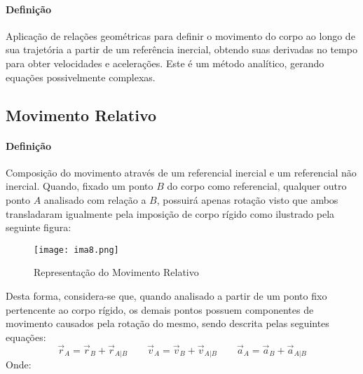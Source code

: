 \documentclass{article}
\begin{document}
            \paragraph{Definição}Aplicação de relações geométricas para definir o movimento do corpo ao longo de sua trajetória a partir de um referência inercial, obtendo suas derivadas no tempo para obter velocidades e acelerações. Este é um método analítico, gerando equações possivelmente complexas.

        \subsection{Movimento Relativo}
            \paragraph{Definição}Composição do movimento através de um referencial inercial e um referencial não inercial. Quando, fixado um ponto $B$ do corpo como referencial, qualquer outro ponto $A$ analisado com relação a $B$, possuirá apenas rotação visto que ambos transladaram igualmente pela imposição de corpo rígido como ilustrado pela seguinte figura:
                \begin{figure}[H]
                    \centering
                    \texttt{[image: ima8.png]}
                    \caption{Representação do Movimento Relativo}
                \end{figure} \noindent
            Desta forma, considera-se que, quando analisado a partir de um ponto fixo pertencente ao corpo rígido, os demais pontos possuem componentes de movimento causados pela rotação do mesmo, sendo descrita pelas seguintes equações:
                \begin{equation}
                    \boxed{
                        \vec{r}_{A} = \vec{r}_{B} + \vec{r}_{A|B}
                    }
                    \qquad
                    \boxed{
                        \vec{v}_{A} = \vec{v}_{B} + \vec{v}_{A|B}
                    }
                    \qquad
                    \boxed{
                        \vec{a}_{A} = \vec{a}_{B} + \vec{a}_{A|B}
                    }
                \end{equation}
            Onde:
\end{document}
